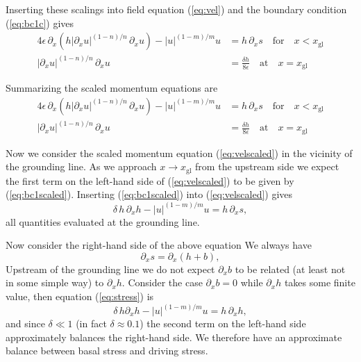 \documentclass[10pt,a4paper]{book}
\newcommand{\p}{\partial}
\newcommand{\xgl}{x_{\mathrm{gl}}}
\begin{document}
Inserting these scalings into field equation (\ref{eq:vel}) and the boundary condition (\ref{eq:bc1c})
gives
\begin{align}
4 \epsilon \, \p_x \left (h |\p_x u|^{(1-n)/n} \, \p_x u \right ) - |u|^{(1-m)/m} u & = h \, \p_x s \quad \text{for} \quad x<\xgl \label{eq:velscaled}\\
|\p_x u|^{(1-n)/n} \, \p_x u&= \frac{\delta h}{8 \epsilon} \quad \text{at} \quad x=\xgl \label{eq:bc1scaled}
\end{align}




Summarizing the scaled momentum equations are
\begin{align}
4 \epsilon \, \p_x \left (h |\p_x u|^{(1-n)/n} \, \p_x u \right ) - |u|^{(1-m)/m} u & = h \, \p_x s \quad \text{for} \quad x<\xgl \label{eq:velscaled2}\\
|\p_x u|^{(1-n)/n} \, \p_x u&= \frac{\delta h}{8 \epsilon} \quad \text{at} \quad x=\xgl \label{eq:bc1scaledb}
\end{align}


Now we consider the scaled momentum equation (\ref{eq:velscaled}) in the
vicinity of the grounding line. As we approach $x \to \xgl$ from
the upstream side we expect the first term on the left-hand side of
(\ref{eq:velscaled}) to be given by (\ref{eq:bc1scaled}). Inserting
(\ref{eq:bc1scaled}) into (\ref{eq:velscaled}) gives
\begin{equation}
\delta  \, h \, \p_x h   - |u|^{(1-m)/m} u  = h \, \p_x s ,
\label{eq:sc3}
\end{equation}
all quantities evaluated at the grounding line.

Now consider the right-hand side of the above equation
We always have
\[ 
\p_x s= \p_x (h+b) ,
\]
Upstream of the grounding line we do not expect $\p_x b$ to be related
(at least not in some simple way) to $\p_x h$. Consider the case
$\p_x b=0$ while $\p_x h$ takes some finite value, then
equation (\ref{eq:stress}) is
\begin{equation}
\delta \, h \p_x h  - |u|^{(1-m)/m} u  = h \, \p_x h  ,
\label{eq:sc4}
\end{equation}
and since $\delta \ll 1$ (in fact $\delta \approx 0.1$) the second
term on the left-hand side approximately balances the right-hand
side. We therefore have an approximate balance between basal stress
and driving stress.
\end{document}
